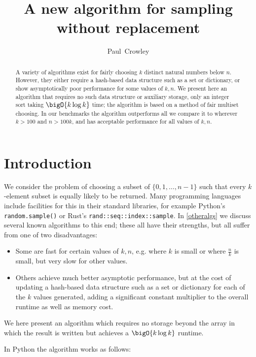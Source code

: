 \documentclass[letterpaper,luatex,11pt]{article}
\title{A new algorithm for sampling without replacement}
\author{Paul~Crowley}
\affil{Google LLC}
\begin{document}
\maketitle
\begin{abstract}
    A variety of algorithms exist for fairly choosing $k$ distinct
    natural numbers below \(n\). However, they either require a
    hash-based data structure such as a set or dictionary, or show
    asymptotically poor performance for some values of $k, n$. We
    present here an algorithm that requires no such data structure or
    auxiliary storage, only an integer sort taking $\bigO{k \log k}$
    time; the algorithm is based on a method of fair multiset
    choosing. In our benchmarks the algorithm outperforms all we
    compare it to wherever \(k > 100\) and \(n > 100k\), and has
    acceptable performance for all values of \(k, n\).
\end{abstract}

\section{Introduction}

We consider the problem of choosing a subset of $\{0, 1, \ldots,
n-1\}$ such that every \(k\)-element subset is equally likely to be
returned. Many programming languages include facilities for this in
their standard libraries, for example Python's
\texttt{random.sample()} or Rust's
\texttt{rand::seq::index::sample}. In \autoref{otheralgs} we
discuss several known algorithms to this end; these all have their
strengths, but all suffer from one of two disadvantages:
\begin{itemize}
    \item Some are fast for certain values of \(k, n\), e.g. where
    \(k\) is small or where \(\frac{n}{k}\) is small, but very slow
    for other values.
    \item Others achieve much better asymptotic performance, but at
    the cost of updating a hash-based data structure such as a set or
    dictionary for each of the \(k\) values generated, adding a
    significant constant multiplier to the overall runtime as well as
    memory cost.
\end{itemize}

We here present an algorithm which requires no storage beyond the array in which
the result is written but achieves a \(\bigO{k \log k}\) runtime.

In Python the algorithm works as follows:
\end{document}
